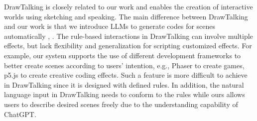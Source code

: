DrawTalking \cite{rosenberg2024drawtalking} is closely related to our work and enables {the creation of} interactive worlds using sketching and speaking. The main difference between DrawTalking and our work is that we introduce LLMs to generate codes for scenes automatically ,  . The rule-based interactions in DrawTalking can involve multiple effects, but {lack} %
flexibility and generalization for scripting customized effects. 
{For example,
{our system supports the use of} %
different {development} frameworks to better create scenes according to users' intention, e.g., Phaser to create games, p5.js to create creative coding effects. {Such a feature is more difficult} %
to achieve in DrawTalking since it is designed with defined rules.  %
In addition, the natural language input in DrawTalking needs to conform to the rules while ours allows users to describe {desired} %
scenes freely due to the understanding capability of ChatGPT.}


\vspace{-1.1mm}
